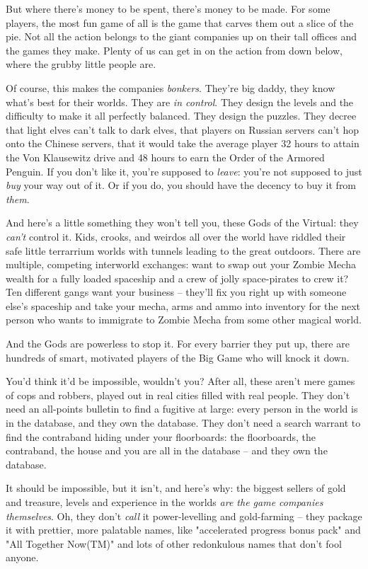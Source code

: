 But where there's money to be spent, there's money to be made. For
some players, the most fun game of all is the game that carves them
out a slice of the pie. Not all the action belongs to the giant
companies up on their tall offices and the games they make. Plenty
of us can get in on the action from down below, where the grubby
little people are.

Of course, this makes the companies \emph{bonkers}. They're big
daddy, they know what's best for their worlds. They are
\emph{in control}. They design the levels and the difficulty to
make it all perfectly balanced. They design the puzzles. They
decree that light elves can't talk to dark elves, that players on
Russian servers can't hop onto the Chinese servers, that it would
take the average player 32 hours to attain the Von Klausewitz drive
and 48 hours to earn the Order of the Armored Penguin. If you don't
like it, you're supposed to \emph{leave}: you're not supposed to
just \emph{buy} your way out of it. Or if you do, you should have
the decency to buy it from \emph{them}.

And here's a little something they won't tell you, these Gods of
the Virtual: they \emph{can't} control it. Kids, crooks, and
weirdos all over the world have riddled their safe little
terrarrium worlds with tunnels leading to the great outdoors. There
are multiple, competing interworld exchanges: want to swap out your
Zombie Mecha wealth for a fully loaded spaceship and a crew of
jolly space-pirates to crew it? Ten different gangs want your
business -- they'll fix you right up with someone else's spaceship
and take your mecha, arms and ammo into inventory for the next
person who wants to immigrate to Zombie Mecha from some other
magical world.

And the Gods are powerless to stop it. For every barrier they put
up, there are hundreds of smart, motivated players of the Big Game
who will knock it down.

You'd think it'd be impossible, wouldn't you? After all, these
aren't mere games of cops and robbers, played out in real cities
filled with real people. They don't need an all-points bulletin to
find a fugitive at large: every person in the world is in the
database, and they own the database. They don't need a search
warrant to find the contraband hiding under your floorboards: the
floorboards, the contraband, the house and you are all in the
database -- and they own the database.

It should be impossible, but it isn't, and here's why: the biggest
sellers of gold and treasure, levels and experience in the worlds
\emph{are the game companies themselves}. Oh, they don't
\emph{call} it power-levelling and gold-farming -- they package it
with prettier, more palatable names, like "accelerated progress
bonus pack" and "All Together Now(TM)" and lots of other
redonkulous names that don't fool anyone.

